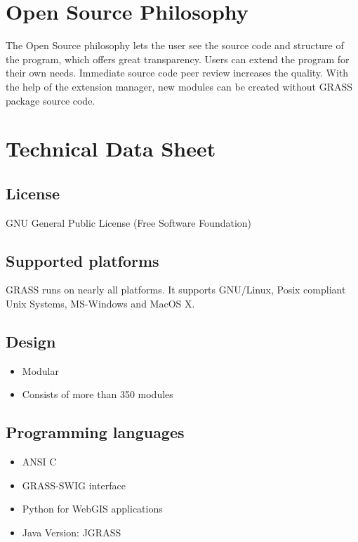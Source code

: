 \documentclass[notumble,a4paper,10pt,nofoldmark]{leaflet}
\begin{document}
\section{Open Source Philosophy}

The Open Source philosophy lets the user see the source code and structure of the program, which offers great transparency. Users can extend the program for their own needs. Immediate source code peer review increases the quality. With the help of the extension manager, new modules can be created without GRASS package source code.

\section{Technical Data Sheet}

\subsection{License}

GNU General Public License (Free Software Foundation)

\subsection{Supported platforms}

GRASS runs on nearly all platforms. It supports GNU/Linux, Posix compliant Unix Systems, MS-Windows and MacOS X.

\subsection{Design}

\begin{itemize}
\item Modular
\item Consists of more than 350 modules
\end{itemize}

\subsection{Programming languages}

\begin{itemize}
\item ANSI C
\item GRASS-SWIG interface
\item Python for WebGIS applications
\item Java Version: JGRASS
\end{itemize}
\end{document}

